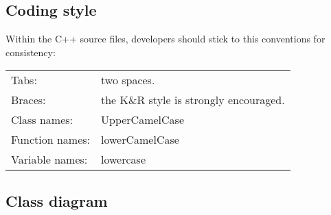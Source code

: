 \documentclass[12pt,a4paper]{article}
\begin{document}
\subsection{Coding style}

Within the C++ source files, developers should stick to this conventions for consistency:

\begin{tabular}{ l l }
	Tabs:& two spaces.\\
	Braces:& the K\&R style is strongly encouraged.\\
	Class names:&UpperCamelCase\\
	Function names:&lowerCamelCase\\
	Variable names:&lowercase
\end{tabular}

\subsection{Class diagram}
\end{document}
